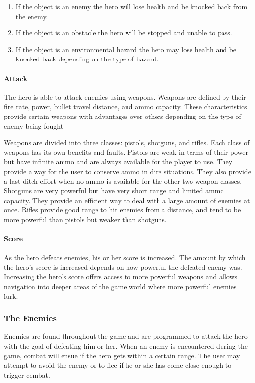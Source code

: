 \documentclass[12pt, titlepage]{article}
\begin{document}
\begin{enumerate}
  \item If the object is an enemy the hero will lose health and be knocked back from the enemy.
  \item If the object is an obstacle the hero will be stopped and unable to pass.
  \item If the object is an environmental hazard the hero may lose health and be knocked back depending on the type of hazard.
\end{enumerate}

\paragraph{Attack}
The hero is able to attack enemies using weapons.  Weapons are defined by their fire rate, power, bullet travel distance, and ammo capacity. These characteristics provide certain weapons with advantages over others depending on the type of enemy being fought.

Weapons are divided into three classes: pistols, shotguns, and rifles. Each class of weapons has its own benefits and faults. Pistols are weak in terms of their power but have infinite ammo and are always available for the player to use.  They provide a way for the user to conserve ammo in dire situations.  They also provide a last ditch effort when no ammo is available for the other two weapon classes.  Shotguns are very powerful but have very short range and limited ammo capacity. They provide an efficient way to deal with a large amount of enemies at once.  Rifles provide good range to hit enemies from a distance, and tend to be more powerful than pistols but weaker than shotguns.

\paragraph{Score}
As the hero defeats enemies, his or her score is increased.  The amount by which the hero's score is increased depends on how powerful the defeated enemy was. Increasing the hero's score offers access to more powerful weapons and allows navigation into deeper areas of the game world where more powerful enemies lurk.




\subsubsection{The Enemies}
Enemies are found throughout the game and are programmed to attack the hero with the goal of defeating him or her.  When an enemy is encountered during the game, combat will ensue if the hero gets within a certain range.  The user may attempt to avoid the enemy or to flee if he or she has come close enough to trigger combat.
\end{document}
